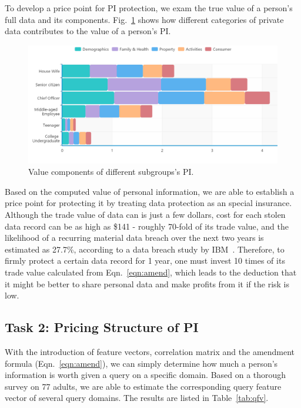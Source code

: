 \documentclass{mcmthesis}
\begin{document}
To develop a price point for PI protection, we exam the true value of a person's full data and its components. Fig.~\ref{fig:valueeee} shows how different categories of private data contributes to the value of a person's PI. 

\begin{figure}[htbp]
\begin{center}
\includegraphics[width=0.85\linewidth]{fig/barr.png}
\caption{Value components of different subgroups's PI.}
\label{fig:valueeee}
\end{center}
\end{figure}

Based on the computed value of personal information, we are able to establish a price point for protecting it by treating data protection as an special insurance. Although the trade value of data can is just a few dollars, cost for each stolen data record can be as high as \$141 - roughly 70-fold of its trade value, and the likelihood of a recurring material data breach over the next two years is estimated as 27.7\%, according to a data breach study by IBM~\cite{IBMreport}. Therefore, to firmly protect a certain data record for 1 year, one must invest 10 times of its trade value calculated from Eqn.~\eqref{eqn:amend}, which leads to the deduction that it might be better to share personal data and make profits from it if the risk is low.

\subsection{Task 2: Pricing Structure of PI}
\label{sec:task2}

With the introduction of feature vectors, correlation matrix and the amendment formula (Eqn.~\eqref{eqn:amend}), we can simply determine how much a person's information is worth given a query on a specific domain. Based on a thorough survey on 77 adults, we are able to estimate the corresponding query feature vector of several query domains. The results are listed in Table~\ref{tab:qfv}. 
\end{document}
